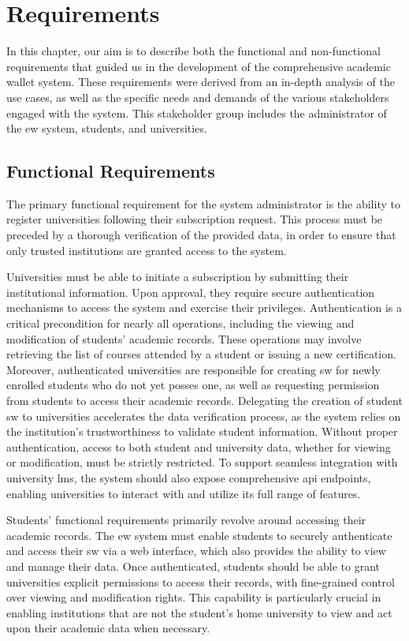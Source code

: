 \chapter{Requirements}

In this chapter, our aim is to describe both the functional and non-functional requirements that guided us in the development of the comprehensive academic wallet system. These requirements were derived from an in-depth analysis of the use cases, as well as the specific needs and demands of the various stakeholders engaged with the system. This stakeholder group includes the administrator of the \acrfull{ew} system, students, and universities.

\section{Functional Requirements}
The primary functional requirement for the system administrator is the ability to register universities following their subscription request. This process must be preceded by a thorough verification of the provided data, in order to ensure that only trusted institutions are granted access to the system.

Universities must be able to initiate a subscription by submitting their institutional information. Upon approval, they require secure authentication mechanisms to access the system and exercise their privileges. Authentication is a critical precondition for nearly all operations, including the viewing and modification of students' academic records. These operations may involve retrieving the list of courses attended by a student or issuing a new certification. Moreover, authenticated universities are responsible for creating \acrfull{sw} for newly enrolled students who do not yet posses one, as well as requesting permission from students to access their academic records. Delegating the creation of student \acrshort{sw} to universities accelerates the data verification process, as the system relies on the institution's trustworthiness to validate student information. Without proper authentication, access to both student and university data, whether for viewing or modification, must be strictly restricted. To support seamless integration with university \acrfull{lms}, the system should also expose comprehensive \acrfull{api} endpoints, enabling universities to interact with and utilize its full range of features.

Students' functional requirements primarily revolve around accessing their academic records. The \acrshort{ew} system must enable students to securely authenticate and access their \acrshort{sw} via a web interface, which also provides the ability to view and manage their data. Once authenticated, students should be able to grant universities explicit permissions to access their records, with fine-grained control over viewing and modification rights. This capability is particularly crucial in enabling institutions that are not the student's home university to view and act upon their academic data when necessary.

